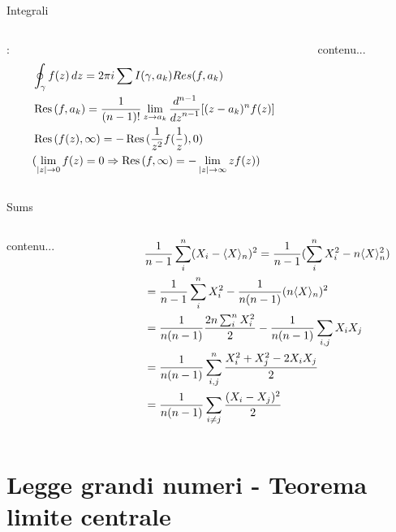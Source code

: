 \documentclass[asd-beamer.tex]{subfiles}
\begin{document}
\begin{frame}{Integrali}\frameintoc
\begin{columns}[T]
\begin{column}{0.5\textwidth}
:
\begin{align*}
&\oint_{\gamma}f(z)\,dz=2\pi i\sum I(\gamma,a_k)Res(f,a_k)\\
&\operatorname{Res}{(f, a_k)}=\frac{1}{(n-1)!}\lim_{z\to a_k}\frac{d^{n-1}}{{d z}^{n-1}}[(z-a_k)^nf(z)]\\
&\operatorname{Res}{(f(z),\infty)}=-\operatorname{Res}{(\frac{1}{z^2}f(\frac{1}{z}),0)}\\
&(\lim_{|z|\to0}f(z)=0\Rightarrow\operatorname{Res}{(f,\infty)}=-\lim_{|z|\to\infty}zf(z))
\end{align*}
\end{column}
\begin{column}{0.5\textwidth}
	contenu...
\end{column}
\end{columns}
\end{frame}

\begin{frame}{Sums}
	\begin{columns}[T]
	\begin{column}{0.5\textwidth}
		contenu...
	\end{column}
	\begin{column}{0.5\textwidth}
	\begin{align*}
	&\frac{1}{n-1}\sum_i^n(X_i-\langle X \rangle_n)^2=\frac{1}{n-1}(\sum_i^nX_i^2-n\langle X \rangle_n^2)\\
	&=\frac{1}{n-1}\sum_i^nX_i^2-\frac{1}{n(n-1)}(n\langle X \rangle_n)^2\\
	&=\frac{1}{n(n-1)}\frac{2n\sum_i^nX_i^2}{2}-\frac{1}{n(n-1)}\sum_{i,j}X_iX_j\\
	&=\frac{1}{n(n-1)}\sum_{i,j}^n\frac{X_i^2+X_j^2-2X_iX_j}{2}\\
	&=\frac{1}{n(n-1)}\sum_{i\neq j}\frac{(X_i-X_j)^2}{2}
	\end{align*}
	\end{column}
	\end{columns}
\end{frame}

\section{Legge grandi numeri - Teorema limite centrale}
\end{document}
